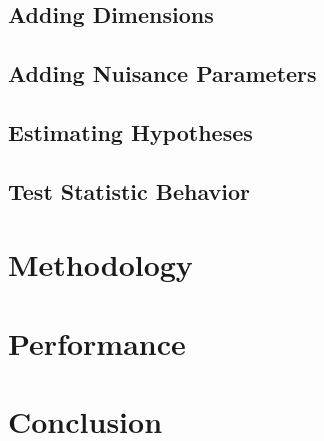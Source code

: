 \documentclass[%
reprint, linenumbers,
groupedaddress,
amsmath,amssymb,
aps, physrev,
]{revtex4-2}
\begin{document}
\subsection{Adding Dimensions}

\subsection{Adding Nuisance Parameters}



\subsection{Estimating Hypotheses}



\subsection{Test Statistic Behavior}




\section{Methodology}




\section{Performance}






\section{Conclusion}



\begin{acknowledgments}
\end{acknowledgments}
\clearpage

\appendix





\end{document}
